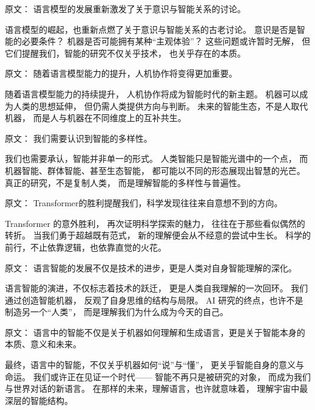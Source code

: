 原文：
语言模型的发展重新激发了关于意识与智能关系的讨论。  

语言模型的崛起，也重新点燃了关于意识与智能关系的古老讨论。  
意识是否是智能的必要条件？  
机器是否可能拥有某种“主观体验”？  
这些问题或许暂时无解，  
但它们提醒我们，智能的研究不仅关乎技术，  
也关乎存在的本质。  



原文：
随着语言模型能力的提升，人机协作将变得更加重要。  

随着语言模型能力的持续提升，  
人机协作将成为智能时代的新主题。  
机器可以成为人类的思想延伸，  
但仍需人类提供方向与判断。  
未来的智能生态，不是人取代机器，  
而是人与机器在不同维度上的互补共生。  



原文：
我们需要认识到智能的多样性。  

我们也需要承认，智能并非单一的形式。  
人类智能只是智能光谱中的一个点，  
而机器智能、群体智能、甚至生态智能，  
都可能以不同的形态展现出智慧的光芒。  
真正的研究，不是复制人类，  
而是理解智能的多样性与普遍性。  



原文：
Transformer的胜利提醒我们，科学发现往往来自意想不到的方向。  

Transformer 的意外胜利，  
再次证明科学探索的魅力，  
往往在于那些看似偶然的转折。  
当我们勇于超越既有范式，  
新的理解便会从不经意的尝试中生长。  
科学的前行，不止依靠逻辑，也依靠直觉的火花。  



原文：
语言智能的发展不仅是技术的进步，更是人类对自身智能理解的深化。  

语言智能的演进，不仅标志着技术的跃迁，  
更是人类自我理解的一次回环。  
我们通过创造智能机器，  
反观了自身思维的结构与局限。  
AI 研究的终点，也许不是制造另一个“人类”，  
而是理解我们为什么成为今天的自己。  



原文：
语言中的智能不仅是关于机器如何理解和生成语言，更是关于智能本身的本质、意义和未来。  

最终，语言中的智能，不仅关乎机器如何“说”与“懂”，  
更关乎智能自身的意义与命运。  
我们或许正在见证一个时代——  
智能不再只是被研究的对象，  
而成为我们与世界对话的新语言。  
在那样的未来，理解语言，也许就意味着，  
理解宇宙中最深层的智能结构。  



